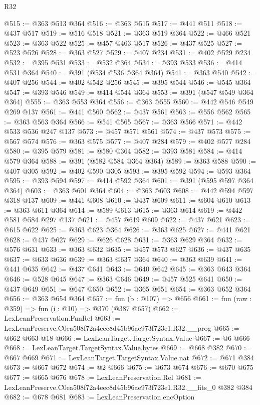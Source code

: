 \begin{lexlean}{R32}
\begin{coremodule}
@515 := @363 @513 @364
@516 := @363 @515
@517 := @441 @511
@518 := @437 @517
@519 := @516 @518
@521 := @363 @519 @364
@522 := @466 @521
@523 := @363 @522
@525 := @457 @463 @517
@526 := @437 @525
@527 := @523 @526
@528 := @363 @527
@529 := @407 @234
@531 := @402 @529 @234
@532 := @395 @531
@533 := @532 @364
@534 := @393 @533
@536 := @414 @531 @364
@540 := @391 (@534 @536 @364 @364)
@541 := @363 @540
@542 := @407 @256
@544 := @402 @542 @256
@545 := @395 @544
@546 := @545 @364
@547 := @393 @546
@549 := @414 @544 @364
@553 := @391 (@547 @549 @364 @364)
@555 := @363 @553 @364
@556 := @363 @555
@560 := @442 @546 @549 @269 @137
@561 := @441 @560
@562 := @437 @561
@563 := @556 @562
@565 := @363 @563 @364
@566 := @541 @565
@567 := @363 @566
@571 := @442 @533 @536 @247 @137
@573 := @457 @571 @561
@574 := @437 @573
@575 := @567 @574
@576 := @363 @575
@577 := @407 @284
@579 := @402 @577 @284
@580 := @395 @579
@581 := @580 @364
@582 := @393 @581
@584 := @414 @579 @364
@588 := @391 (@582 @584 @364 @364)
@589 := @363 @588
@590 := @407 @305
@592 := @402 @590 @305
@593 := @395 @592
@594 := @593 @364
@595 := @393 @594
@597 := @414 @592 @364
@601 := @391 (@595 @597 @364 @364)
@603 := @363 @601 @364
@604 := @363 @603
@608 := @442 @594 @597 @318 @137
@609 := @441 @608
@610 := @437 @609
@611 := @604 @610
@613 := @363 @611 @364
@614 := @589 @613
@615 := @363 @614
@619 := @442 @581 @584 @297 @137
@621 := @457 @619 @609
@622 := @437 @621
@623 := @615 @622
@625 := @363 @623 @364
@626 := @363 @625
@627 := @441 @621
@628 := @437 @627
@629 := @626 @628
@631 := @363 @629 @364
@632 := @576 @631
@633 := @363 @632
@635 := @457 @573 @627
@636 := @437 @635
@637 := @633 @636
@639 := @363 @637 @364
@640 := @363 @639
@641 := @441 @635
@642 := @437 @641
@643 := @640 @642
@645 := @363 @643 @364
@646 := @528 @645
@647 := @363 @646
@649 := @457 @525 @641
@650 := @437 @649
@651 := @647 @650
@652 := @365 @651
@654 := @363 @652 @364
@656 := @363 @654 @364
@657 := fun (b : @107) => @656
@661 := fun (raw : @359) => fun (i : @10) => @370 (@387 @657)
@662 := LexLeanPreservation.FunRel
@663 := LexLeanPreserve.C0ea508f72a4eec8d45b96ae973f723e1.R32.__prog
@665 := @662 @663 @18
@666 := LexLeanTarget.TargetSyntax.Value
@667 := @6 @666
@668 := LexLeanTarget.TargetSyntax.Value.bytes
@669 := @668 @382
@670 := @667 @669
@671 := LexLeanTarget.TargetSyntax.Value.nat
@672 := @671 @384
@673 := @667 @672
@674 := @2 @666
@675 := @673 @674
@676 := @670 @675
@677 := @665 @676
@678 := LexLeanPreservation.Rel
@681 := LexLeanPreserve.C0ea508f72a4eec8d45b96ae973f723e1.R32.__fits_0 @382 @384
@682 := @678 @681
@683 := LexLeanPreservation.encOption

\end{coremodule}
\end{lexlean}
